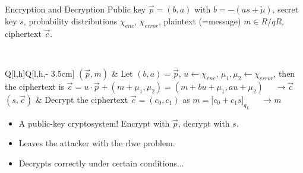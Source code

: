 \begin{frame}{Encryption and Decryption}
  Public key $\vec{p} = (b, a)$ with $b = -(as + \tilde{\mu})$, secret key $s$, probability distributions $\chi_{enc}$, $\chi_{error}$, plaintext (=message) $m \in R/qR$, ciphertext $\vec{c}$.

   \\
  \begin{tblr}{Q[l,h]Q[l,h,\textwidth - 3.5cm]}
    $(\vec{p}, m)$ & {
        Let $(b,a) = \vec{p}$, $u \leftarrow \chi_{enc}$, $\mu_1, \mu_2 \leftarrow \chi_{error}$,
        then the ciphertext is $\vec{c} = u \cdot \vec{p} + (m + \mu_1, \mu_2) = (m + bu + \mu_1, au + \mu_2)$
        $\quad\rightarrow \vec{c}$} \\
    $(s, \vec{c})$ & {
        Decrypt the ciphertext $\vec{c} = (c_0, c_1)$ as $m = \lbrack c_0 + c_1 s\rbrack_{q_L}$
        $\quad\rightarrow m$} \\
  \end{tblr}
  \begin{itemize}
    \item A public-key cryptosystem! Encrypt with $\vec{p}$, decrypt with $s$.
    \item Leaves the attacker with the \gls{rlwe} problem.
    \item Decrypts correctly under certain conditions...
  \end{itemize}
\end{frame}

